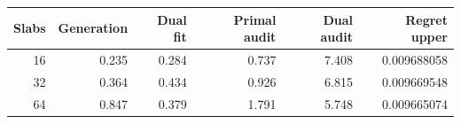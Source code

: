 \begin{tabular}{rrrrrr}
\toprule
Slabs & Generation & Dual fit & Primal audit & Dual audit & Regret upper \\
\midrule
16 & 0.235 & 0.284 & 0.737 & 7.408 & 0.009688058 \\
32 & 0.364 & 0.434 & 0.926 & 6.815 & 0.009669548 \\
64 & 0.847 & 0.379 & 1.791 & 5.748 & 0.009665074 \\
\bottomrule
\end{tabular}
